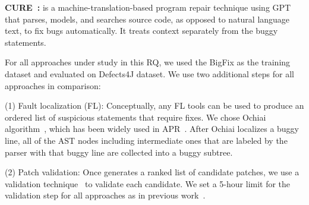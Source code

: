 

{\bf CURE~\cite{cure-icse21}: } is a machine-translation-based program
repair technique using GPT~\cite{radford2018improving} that parses,
models, and searches source code, as opposed to natural language text,
to fix bugs automatically. It treats context separately from the buggy
statements.




For all approaches under study in this RQ, we used the BigFix as the
training dataset and evaluated on Defects4J dataset. 
We use two additional steps for all approaches in comparison:

(1) Fault localization (FL): Conceptually, any FL
tools can be used to produce an ordered list of suspicious
statements that require fixes. We chose Ochiai
algorithm~\cite{abreu2006evaluation, pearson2017evaluating}, which has
been widely used in
APR~\cite{jiang2018shaping,xiong2017precise,koyuncu2018fixminer,xin2017leveraging,wen2018context,liu2018lsrepair}.
After Ochiai localizes a buggy line, all of the AST nodes including
intermediate ones that are labeled by the parser with that buggy line
are collected into a buggy subtree.

(2) Patch validation: Once {\tool} generates a ranked list of
candidate patches, we use a validation
technique~\cite{saha2017elixir,jiang2018shaping} to validate each
candidate.
We set a 5-hour limit for the validation step for all approaches as in
previous work~\cite{icse20,tbar-issta19}.

